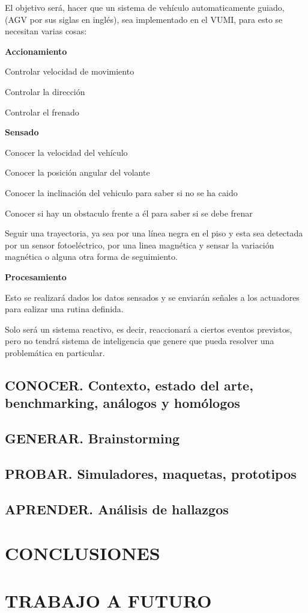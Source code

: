 \documentclass[12pt,letterpaper]{book}
\begin{document}
El objetivo será, hacer que un sistema de vehículo automaticamente guiado, (AGV por sus siglas en inglés), sea implementado en el VUMI, para esto se necesitan varias cosas:

\textbf{Accionamiento}

Controlar velocidad de movimiento

Controlar la dirección

Controlar el frenado

\textbf{Sensado}

Conocer la velocidad del vehículo

Conocer la posición angular del volante

Conocer la inclinación del vehiculo para saber si no se ha caido

Conocer si hay un obstaculo frente a él para saber si se debe frenar

Seguir una trayectoria, ya sea por una línea negra en el piso y esta sea detectada por un sensor fotoeléctrico, por una linea magnética y sensar la variación magnética o alguna otra forma de seguimiento.

\textbf{Procesamiento}

Esto se realizará dados los datos sensados y se enviarán señales a los actuadores para ealizar una rutina definida.

Solo será un sistema reactivo, es decir, reaccionará a ciertos eventos previstos, pero no tendrá sistema de inteligencia que genere que pueda resolver una problemática en particular.




\section{CONOCER. Contexto, estado del arte, benchmarking, análogos y homólogos}

\section{GENERAR. Brainstorming}

\section{PROBAR. Simuladores, maquetas, prototipos}

\section{APRENDER. Análisis de hallazgos}

\newpage

\chapter{CONCLUSIONES}

\chapter{TRABAJO A FUTURO}
\end{document}
